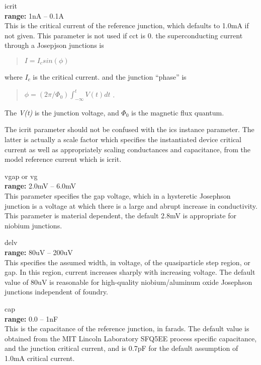 \begin{description}
\item{\vt icrit}\\
{\bf range:} 1nA -- 0.1A\\
This is the critical current of the reference junction, which defaults
to 1.0mA if not given.  This parameter is not used if {\vt cct} is 0.
the superconducting current through a Josepjson junctions is
\begin{quote}
$I = I_c sin(\phi)$
\end{quote}
where $I_c$ is the critical current. and the junction ``phase'' is
\begin{quote}
$\phi = (2\pi/\Phi_0)\int^t_{-\infty} V(t)dt$ .
\end{quote}
The {\it V(t)} is the junction voltage, and $\Phi_0$ is the magnetic
flux quantum.

The {\vt icrit} parameter should not be confused with the
{\vt ics} instance parameter.  The latter is actually a scale
factor which specifies the instantiated device critical current as
well as appropriately scaling conductances and capacitance, from
the model reference current which is {\vt icrit}.

\item{{\vt vgap} or {\vt vg}}\\
{\bf range:} 2.0mV -- 6.0mV\\
This parameter specifies the gap voltage, which in a hysteretic
Josephson junction is a voltage at which there is a large and abrupt
increase in conductivity.  This parameter is material dependent, the
default 2.8mV is appropriate for niobium junctions.

\item{\vt delv}\\
{\bf range:} 80uV -- 200uV\\
This specifies the assumed width, in voltage, of the quasiparticle
step region, or gap.  In this region, current increases sharply with
increasing voltage.  The default value of 80uV is reasonable for
high-quality niobium/aluminum oxide Josephson junctions independent of
foundry.

\item{\vt cap}\\
{\bf range:} 0.0 -- 1nF\\
This is the capacitance of the reference junction, in farads.  The
default value is obtained from the MIT Lincoln Laboratory SFQ5EE
process specific capacitance, and the junction critical current, and
is 0.7pF for the default assumption of 1.0mA critical current.


\end{description}
